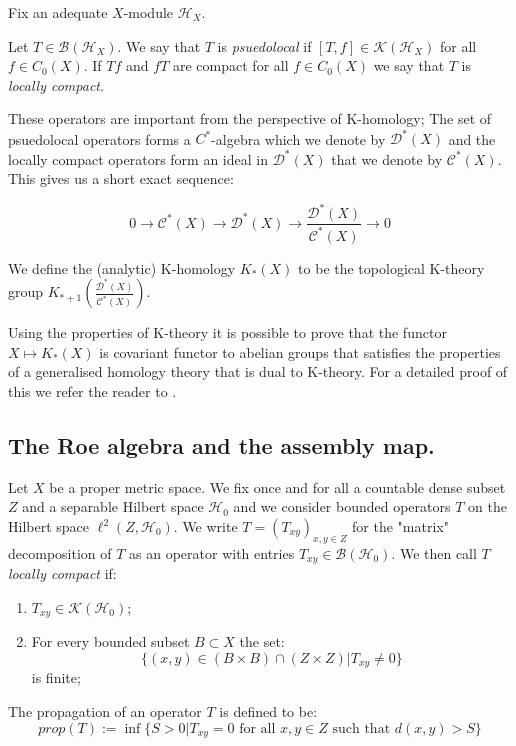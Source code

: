 Fix an adequate $X$-module $\mathcal{H}_{X}$.

\begin{definition}
Let $T \in \mathcal{B}(\mathcal{H}_{X})$. We say that $T$ is \textit{psuedolocal} if $[T,f] \in \mathcal{K}(\mathcal{H}_{X})$ for all $f \in C_{0}(X)$. If $Tf$ and $fT$ are compact for all $f \in C_{0}(X)$ we say that $T$ is \textit{locally compact}.
\end{definition}

These operators are important from the perspective of K-homology; The set of psuedolocal operators forms a $C^{*}$-algebra which we denote by $\mathcal{D}^{*}(X)$ and the locally compact operators form an ideal in $\mathcal{D}^{*}(X)$ that we denote by $\mathcal{C}^{*}(X)$. This gives us a short exact sequence:

\begin{equation*}
0 \rightarrow \mathcal{C}^{*}(X) \rightarrow \mathcal{D}^{*}(X) \rightarrow \frac{\mathcal{D}^{*}(X)}{\mathcal{C}^{*}(X)}\rightarrow 0
\end{equation*} 

\begin{definition}
We define the (analytic) K-homology $K_{*}(X)$ to be the topological K-theory group $K_{*+1}(\frac{\mathcal{D}^{*}(X)}{\mathcal{C}^{*}(X)})$.
\end{definition}

Using the properties of K-theory it is possible to prove that the functor $X \mapsto K_{*}(X)$ is covariant functor to abelian groups that satisfies the properties of a generalised homology theory that is dual to K-theory. For a detailed proof of this we refer the reader to \cite{MR1399087,MR1817560}.

\subsection{The Roe algebra and the assembly map.}

Let $X$ be a proper metric space. We fix once and for all a countable dense subset $Z$ and a separable Hilbert space $\mathcal{H}_{0}$ and we consider bounded operators $T$ on the Hilbert space $\ell^{2}(Z,\mathcal{H}_{0})$. We write $T=(T_{xy})_{x,y \in Z}$ for the "matrix" decomposition of $T$ as an operator with entries $T_{xy} \in \mathcal{B}(\mathcal{H}_{0})$. We then call $T$ \textit{locally compact} if:
\begin{enumerate}
\item $T_{xy}\in \mathcal{K}(\mathcal{H}_{0})$;
\item For every bounded subset $B \subset X$ the set:
\begin{equation*}
\lbrace (x,y)\in (B \times B) \cap (Z \times Z) | T_{xy}\not= 0 \rbrace 
\end{equation*}
is finite;
\end{enumerate} 
The propagation of an operator $T$ is defined to be:
\begin{equation*}
prop(T):= \inf \lbrace S>0 | T_{xy}=0 \mbox{ for all } x,y \in Z \mbox{ such that } d(x,y)>S \rbrace
\end{equation*}

